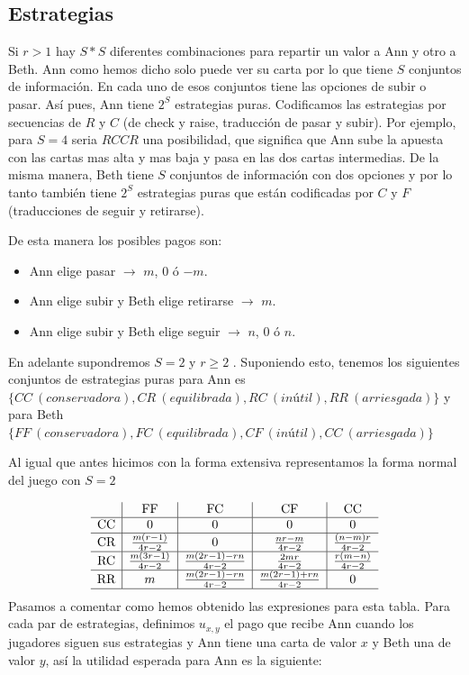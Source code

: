 \documentclass[12pt,a4paper,]{book}
\numberwithin{dummy}{section}
\theoremstyle{ocrenumbox}
\theoremstyle{blacknumex}
\theoremstyle{blacknumbox}
\theoremstyle{ocrenum}
\theoremstyle{ocrenum}
\begin{document}
\hypertarget{Seccion511}{%
\subsection{Estrategias}\label{Seccion511}}

Si \(r>1\) hay \(S*S\) diferentes combinaciones para repartir un valor a
Ann y otro a Beth. Ann como hemos dicho solo puede ver su carta por lo
que tiene \(S\) conjuntos de información. En cada uno de esos conjuntos
tiene las opciones de subir o pasar. Así pues, Ann tiene \(2^S\)
estrategias puras. Codificamos las estrategias por secuencias de \(R\) y
\(C\) (de check y raise, traducción de pasar y subir). Por ejemplo, para
\(S=4\) seria \(RCCR\) una posibilidad, que significa que Ann sube la
apuesta con las cartas mas alta y mas baja y pasa en las dos cartas
intermedias. De la misma manera, Beth tiene \(S\) conjuntos de
información con dos opciones y por lo tanto también tiene \(2^S\)
estrategias puras que están codificadas por \(C\) y \(F\) (traducciones
de seguir y retirarse).

De esta manera los posibles pagos son:

\begin{itemize}
\item
  Ann elige pasar \(\rightarrow\) \(m\), \(0\) ó \(-m\).
\item
  Ann elige subir y Beth elige retirarse \(\rightarrow\) \(m\).
\item
  Ann elige subir y Beth elige seguir \(\rightarrow\) \(n\), \(0\) ó
  \(n\).
\end{itemize}

En adelante supondremos \(S=2\) y \(r \geq 2\) . Suponiendo esto,
tenemos los siguientes conjuntos de estrategias puras para Ann es
\(\{CC \ (conservadora), CR \ (equilibrada),RC \ (inútil),RR \ (arriesgada) \}\)
y para Beth
\(\{FF \ (conservadora), FC \ (equilibrada),CF \ (inútil),CC \ (arriesgada) \}\)

Al igual que antes hicimos con la forma extensiva representamos la forma
normal del juego con \(S=2\)

\[
\begin{array}{c|c|c|c|c}
 & \text{FF} & \text{FC} & \text{CF} & \text{CC} \\
\hline
\text{CC} & 0 & 0 & 0 & 0 \\
\hline
\text{CR} & \frac{m(r-1)}{4r-2} & 0 & \frac{nr-m}{4r-2} & \frac{(n-m)r}{4r-2} \\
\hline
\text{RC} & \frac{m(3r-1)}{4r-2} & \frac{m(2r-1)-rn}{4r-2} & \frac{2mr}{4r-2} & \frac{r(m-n)}{4r-2}  \\
\hline
\text{RR} & m & \frac{m(2r-1)-rn}{4r-2} & \frac{m(2r-1)+rn}{4r-2} & 0 \\
\hline
\end{array}
\] Pasamos a comentar como hemos obtenido las expresiones para esta
tabla. Para cada par de estrategias, definimos \(u_{x,y}\) el pago que
recibe Ann cuando los jugadores siguen sus estrategias y Ann tiene una
carta de valor \(x\) y Beth una de valor \(y\), así la utilidad esperada
para Ann es la siguiente:
\end{document}
